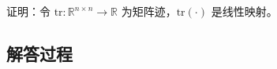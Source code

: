 \begin{example}[矩阵迹的线性性]
    证明：令 \( \text{tr} : \mathbb{R}^{n \times n} \to \mathbb{R} \) 为矩阵迹，\( \text{tr}(\cdot) \) 是线性映射。
    \end{example}
    
    \subsection*{解答过程}
    